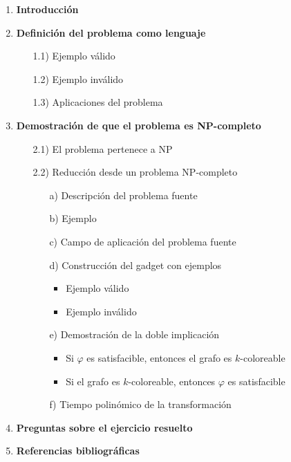 \documentclass[a4paper,12pt]{article}
\begin{document}
\begin{enumerate}
  \item \textbf{Introducción}
  \item \textbf{Definición del problema como lenguaje}
  \begin{enumerate}
    \item[1.1)] Ejemplo válido
    \item[1.2)] Ejemplo inválido
    \item[1.3)] Aplicaciones del problema
  \end{enumerate}
  
  \item \textbf{Demostración de que el problema es NP-completo}
  \begin{enumerate}
    \item[2.1)] El problema pertenece a NP
    \item[2.2)] Reducción desde un problema NP-completo
    \begin{enumerate}
      \item[a)] Descripción del problema fuente
      \item[b)] Ejemplo 
      \item [c)] Campo de aplicación del problema fuente
      \item[d)] Construcción del gadget con ejemplos
      \begin{itemize}
        \item Ejemplo válido
        \item Ejemplo inválido
      \end{itemize}
      \item[e)] Demostración de la doble implicación
      \begin{itemize}
        \item Si $\varphi$ es satisfacible, entonces el grafo es $k$-coloreable
        \item Si el grafo es $k$-coloreable, entonces $\varphi$ es satisfacible
      \end{itemize}
      \item[f)] Tiempo polinómico de la transformación
    \end{enumerate}
  \end{enumerate}

  \item \textbf{Preguntas sobre el ejercicio resuelto}
  \begin{enumerate}
   
  \end{enumerate}

  \item \textbf{Referencias bibliográficas}
\end{enumerate}
\end{document}
